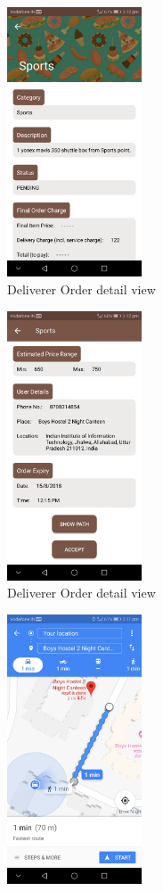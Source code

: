 \documentclass{report}
\begin{document}
\begin{figure}[h!]
\begin{subfigure}[h!]{.24\textwidth}
\centering
\includegraphics[width=4cm]{deliverer_order_detail1.jpg}
\caption{\centering \tiny Deliverer Order detail view}
\end{subfigure}
\begin{subfigure}[h!]{.24\textwidth}
\centering
\includegraphics[width=4cm]{deliverer_order_detail2.jpg}
\caption{\centering \tiny Deliverer Order detail view}
\end{subfigure}
\begin{subfigure}[h!]{.24\textwidth}
\centering
\includegraphics[width=4cm]{show_path.jpg}

\end{subfigure}
\end{figure}
\end{document}
